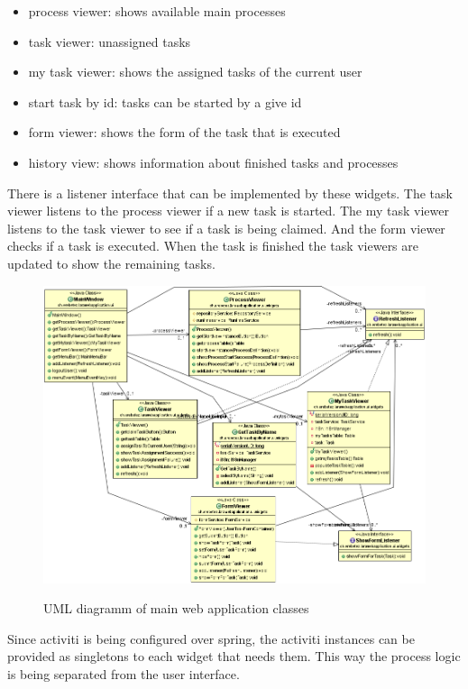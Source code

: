 \documentclass[paper=a4,twoside=false,BCOR=0mm,DIV=calc,fontsize=12pt]{scrartcl}
\begin{document}
\begin{itemize}
 \item process viewer: shows available main processes
 \item task viewer: unassigned tasks
 \item my task viewer: shows the assigned tasks of the current user
 \item start task by id: tasks can be started by a give id
 \item form viewer: shows the form of the task that is executed
 \item history view: shows information about finished tasks and processes
\end{itemize}

There is a listener interface that can be implemented by these widgets. The task viewer listens to the process viewer if a new task is started. The
my task viewer listens to the task viewer to see if a task is being claimed. And the form viewer checks if a task is executed. When the task is
finished the task viewers are updated to show the remaining tasks.

\begin{figure}
    \begin{center}
      \includegraphics[width=1\textwidth]{./img/uml_webapp_model.png}\\
    \end{center}
  \caption{UML diagramm of main web application classes}
  \label{webapplicationclassuml}
\end{figure} 

Since activiti is being configured over spring, the activiti instances can be provided as singletons to each widget that needs them. This way the
process logic is being separated from the user interface.
\end{document}
